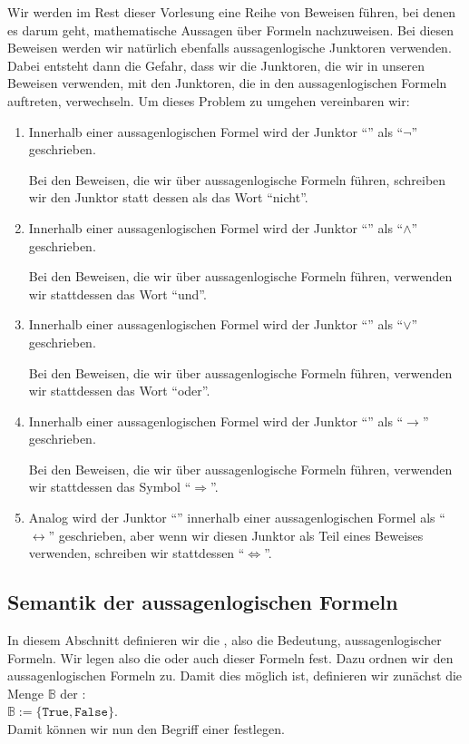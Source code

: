 \remark
Wir werden im Rest dieser Vorlesung eine Reihe von Beweisen führen, bei denen es darum geht,
mathematische Aussagen über Formeln nachzuweisen.  Bei diesen Beweisen werden wir natürlich
ebenfalls aussagenlogische Junktoren verwenden.  Dabei entsteht dann die Gefahr, dass wir die Junktoren,
die wir in unseren Beweisen verwenden, mit den Junktoren, die in den aussagenlogischen Formeln
auftreten, verwechseln.  Um dieses Problem zu umgehen vereinbaren wir:
\begin{enumerate}
\item Innerhalb einer aussagenlogischen Formel wird der Junktor  
      ``'' als ``$\neg$''  geschrieben.
  
      Bei den Beweisen, die wir über aussagenlogische Formeln führen,
      schreiben wir den Junktor statt dessen als das Wort ``nicht''.

\item Innerhalb einer aussagenlogischen Formel wird der Junktor  
      ``'' als ``$\wedge$''  geschrieben.
  
      Bei den Beweisen, die wir über aussagenlogische Formeln führen,
      verwenden wir stattdessen das Wort ``und''.
\item Innerhalb einer aussagenlogischen Formel wird der Junktor  
      ``'' als ``$\vee$''  geschrieben.
  
      Bei den Beweisen, die wir über aussagenlogische Formeln führen,
      verwenden wir stattdessen das Wort ``oder''.
\item Innerhalb einer aussagenlogischen Formel wird der Junktor  
      ``'' als ``$\rightarrow$''  geschrieben.
  
      Bei den Beweisen, die wir über aussagenlogische Formeln führen,
      verwenden wir stattdessen das Symbol ``$\Rightarrow$''.
\item Analog wird der Junktor ``'' innerhalb einer aussagenlogischen Formel als
      ``$\leftrightarrow$'' geschrieben, aber wenn wir diesen Junktor als Teil eines Beweises verwenden,
      schreiben wir stattdessen ``$\Leftrightarrow$''. \eox      
\end{enumerate}


\subsection{Semantik der aussagenlogischen Formeln}
In diesem Abschnitt definieren wir die , also die Bedeutung, aussagenlogischer Formeln.  Wir
legen also die  oder auch  dieser Formeln fest.  Dazu ordnen wir den
aussagenlogischen Formeln  zu.  Damit dies möglich ist, definieren wir
zunächst die Menge $\mathbb{B}$ der :  \\[0.2cm] 
\hspace*{1.3cm} $\mathbb{B} := \{ \texttt{True}, \texttt{False} \}$. \\[0.2cm]
Damit können wir nun
den Begriff einer  festlegen.

